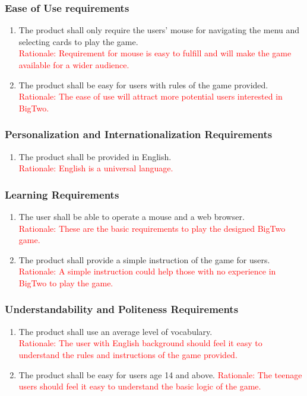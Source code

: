 \documentclass[12pt, titlepage]{article}
\begin{document}
\subsubsection{Ease of Use requirements}
\begin{enumerate}
    \item The product shall only require the users' mouse for navigating the menu and selecting cards to play the game.\\
    \textcolor{red}{Rationale: Requirement for mouse is easy to fulfill and will make the game available for a wider audience.}
    \item The product shall be easy for users with rules of the game provided.
    \textcolor{red}{Rationale: The ease of use will attract more potential users interested in BigTwo.}
\end{enumerate}

\subsubsection{Personalization and Internationalization Requirements}
\begin{enumerate}
    \item The product shall be provided in English.\\
    \textcolor{red}{Rationale: English is a universal language.}
\end{enumerate}

\subsubsection{Learning Requirements}
\begin{enumerate}
    \item The user shall be able to operate a mouse and a web browser.\\
    \textcolor{red}{Rationale: These are the basic requirements to play the designed BigTwo game.}
    \item The product shall provide a simple instruction of the game for users.\\
    \textcolor{red}{Rationale: A simple instruction could help those with no experience in BigTwo to play the game.}
\end{enumerate}

\subsubsection{Understandability and Politeness Requirements}
\begin{enumerate}
    \item The product shall use an average level of vocabulary.\\
    \textcolor{red}{Rationale: The user with English background should feel it easy to understand the rules and instructions of the game provided.}
    \item The product shall be easy for users age 14 and above.
    \textcolor{red}{Rationale: The teenage users should feel it easy to understand the basic logic of the game.}
\end{enumerate}
\end{document}
